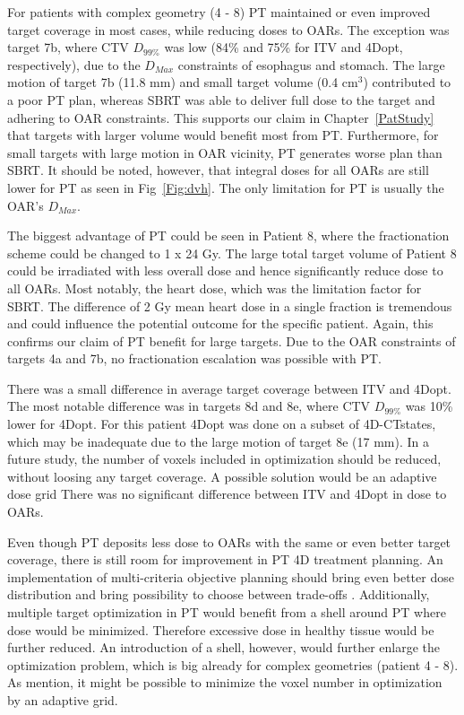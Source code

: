 For patients with complex geometry (4 - 8) PT maintained or even improved target coverage in most cases, while reducing doses to OARs.
The exception was target 7b, where CTV $D_{99\%}$ was low (84\% and 75\% for ITV and 4Dopt, respectively), due to the $D_{Max}$ constraints of esophagus and stomach.
The large motion of target 7b (11.8 mm) and small target volume (0.4 cm$^3$) contributed to a poor PT plan, whereas SBRT was able to deliver full dose to the target
and adhering to OAR constraints. This supports our claim in Chapter~\ref{PatStudy} that targets with larger volume would benefit most from PT. Furthermore, for small targets
with large motion in OAR vicinity, PT generates worse plan than SBRT. It should be noted, however, that integral doses for all OARs are still lower for PT as seen in Fig~\ref{Fig:dvh}.
The only limitation for PT is usually the OAR's $D_{Max}$.

The biggest advantage of PT could be seen in Patient 8, where the fractionation scheme could be changed to 1 x 24 Gy. 
The large total target volume of Patient 8 could be irradiated with less overall dose and hence significantly reduce dose to all OARs. Most notably, the heart dose,
which was the limitation factor for SBRT. The difference of 2 Gy mean heart dose in a single fraction is tremendous and could influence the potential outcome for the specific patient.
Again, this confirms our claim of PT benefit for large targets.
Due to the OAR constraints of targets 4a and 7b, no fractionation escalation was possible with PT. 

There was a small difference in average target coverage between ITV and 4Dopt. The most notable difference was in targets 8d and 8e, where CTV $D_{99\%}$ was 10\% lower
for 4Dopt. For this patient 4Dopt was done on a subset of 4D-CTstates, which may be inadequate due to the large motion of target 8e (17 mm). In a future study,
the number of voxels included in optimization should be reduced, without loosing any target coverage. A possible solution would be an adaptive dose grid \cite{Prall2016a}
There was no significant difference between ITV and 4Dopt in dose to OARs. 


Even though PT deposits less dose to OARs with the same or even better target coverage, there is still room for improvement in PT 4D treatment planning. 
An implementation of multi-criteria objective planning should bring even better dose distribution and bring possibility to choose between trade-offs \cite{Breedveld2007, Chen2010}. 
Additionally, multiple target optimization in PT would benefit from a shell around PT where dose would be minimized. Therefore excessive dose
in healthy tissue would be further reduced. An introduction of a shell, however, would further enlarge the optimization problem, which is big already for complex geometries 
(patient 4 - 8). As mention, it might be possible to minimize the voxel number in optimization by an adaptive grid.

